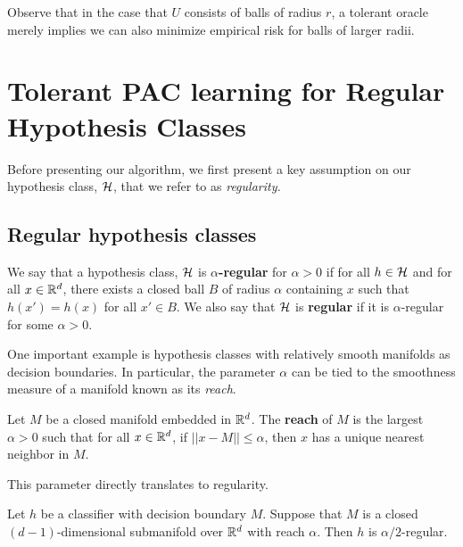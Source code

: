 Observe that in the case that $U$ consists of balls of radius $r$, a tolerant oracle merely implies we can also minimize empirical risk for balls of larger radii. 

\section{Tolerant PAC learning for Regular Hypothesis Classes}

Before presenting our algorithm, we first present a key assumption on our hypothesis class, $\mathcal H$, that we refer to as \textit{regularity.}

\subsection{Regular hypothesis classes}

\begin{defn}
We say that a hypothesis class, $\mathcal H$ is \textbf{$\alpha$-regular} for $\alpha > 0$ if for all $h \in \mathcal H$ and for all $x \in \mathbb{R}^d$, there exists a closed ball $B$ of radius $\alpha$ containing $x$ such that $h(x') = h(x)$ for all $x' \in B$. We also say that $\mathcal H$ is \textbf{regular} if it is $\alpha$-regular for some $\alpha > 0$. 
\end{defn}

One important example is hypothesis classes with relatively smooth manifolds as decision boundaries. In particular, the parameter $\alpha$ can be tied to the smoothness measure of a manifold known as its \textit{reach}.

\begin{defn}
Let $M$ be a closed manifold embedded in $\mathbb{R}^d$. The \textbf{reach} of $M$ is the largest $\alpha > 0$ such that for all $x \in \mathbb{R}^d$, if $||x - M|| \leq \alpha$, then $x$ has a unique nearest neighbor in $M$.
\end{defn}

This parameter directly translates to regularity.

\begin{prop}\label{prop:reach}
Let $h$ be a classifier with decision boundary $M$. Suppose that $M$ is a closed $(d-1)$-dimensional submanifold over $\mathbb{R}^d$ with reach $\alpha$. Then $h$ is $\alpha/2$-regular. 
\end{prop}

